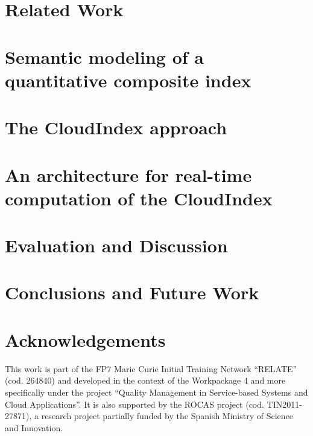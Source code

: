 \documentclass{llncs}
\begin{document}
\section{Related Work}

\section{Semantic modeling of a quantitative composite index}

\section{The CloudIndex approach}
% 
\section{An architecture for real-time computation of the CloudIndex}
% 
\section{Evaluation and Discussion}
% 
\section{Conclusions and Future Work}
% 

\section{Acknowledgements}
This work is part of the FP7 Marie Curie Initial Training Network ``RELATE'' (cod. 264840) and developed in the context 
of the Workpackage 4 and more specifically under the project ``Quality Management in Service-based Systems and Cloud Applications''. It is 
also supported by the ROCAS project (cod. TIN2011-27871), a research project partially funded by the Spanish Ministry of Science and Innovation.

\clearpage



\end{document}
